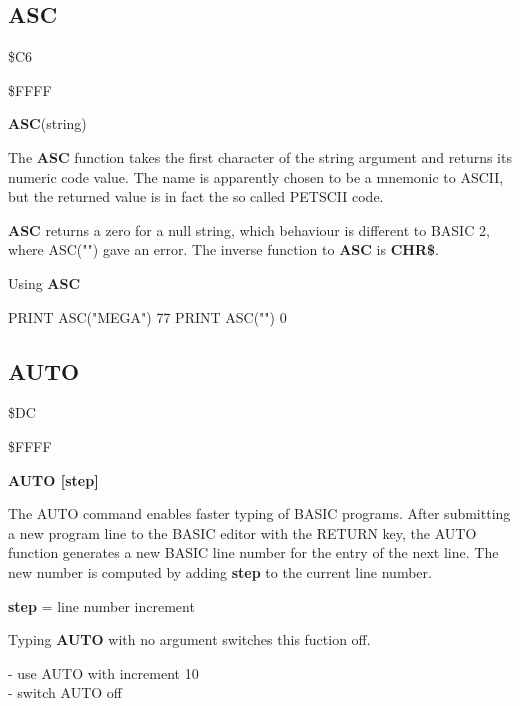 \subsection{ASC}
\begin{description}[leftmargin=3cm,style=nextline]
\item [Token:] \$C6
\item [Address:] \$FFFF
\item [Format:] {\bf ASC}(string)
\item [Usage:] The {\bf ASC} function takes the first character of
               the string argument and returns its numeric code value.
               The name is apparently chosen to be a mnemonic to ASCII,
               but the returned value is in fact the so called PETSCII code.
\item [Remarks:]
               {\bf ASC} returns a zero for a null string, which behaviour
               is different to BASIC 2, where ASC("") gave an error.
               The inverse function to {\bf ASC} is {\bf CHR\$}.
\item [Example:] Using {\bf ASC} \\
\begin{screenoutput}
  PRINT ASC("MEGA")
  77
  PRINT ASC("")
  0
\end{screenoutput}
\end{description}


\newpage
\subsection{AUTO}
\begin{description}[leftmargin=3cm,style=nextline]
\item [Token:] \$DC
\item [Address:] \$FFFF
\item [Format:]
  {\bf AUTO [step]}
\item [Usage:] The AUTO command enables faster typing of BASIC programs.
  After submitting a new program line to the BASIC editor with
  the RETURN key, the AUTO function generates a new BASIC line
  number for the entry of the next line. The new number is
  computed by adding {\bf step} to the current line number.

  {\bf step} = line number increment

  Typing {\bf AUTO} with no argument switches this fuction off.

\item [Example:]  - use AUTO with increment 10 \\
                   - switch AUTO off
\end{description}

